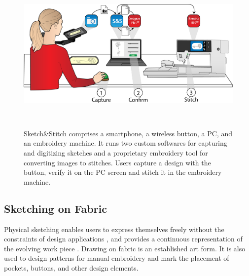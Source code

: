 \documentclass[header.tex]{subfiles}
\begin{document}
\begin{figure}
\centering
  \includegraphics[width=1\columnwidth]{figures/UI.png}
  \caption{Sketch\&Stitch comprises a smartphone, a wireless button, a PC, and an embroidery machine. It runs two custom softwares for capturing and digitizing sketches and a proprietary embroidery tool for converting images to stitches. Users capture a design with the button, verify it on the PC screen and stitch it in the embroidery machine.}~\label{fig:UI}
  \vspace{-2.2em}
\end{figure}


\subsection{Sketching on Fabric}


Physical sketching enables users to express themselves freely without the constraints of design applications \cite{landay1995interactive,Peiris:2014:PTC:2686612.2686691,schweikardt2000digital}, and provides a continuous representation of the evolving work piece \cite{willis2011interactive}. Drawing on fabric is an established art form. It is also used to design patterns for manual embroidery and mark the placement of pockets, buttons, and other design elements. 
\end{document}
